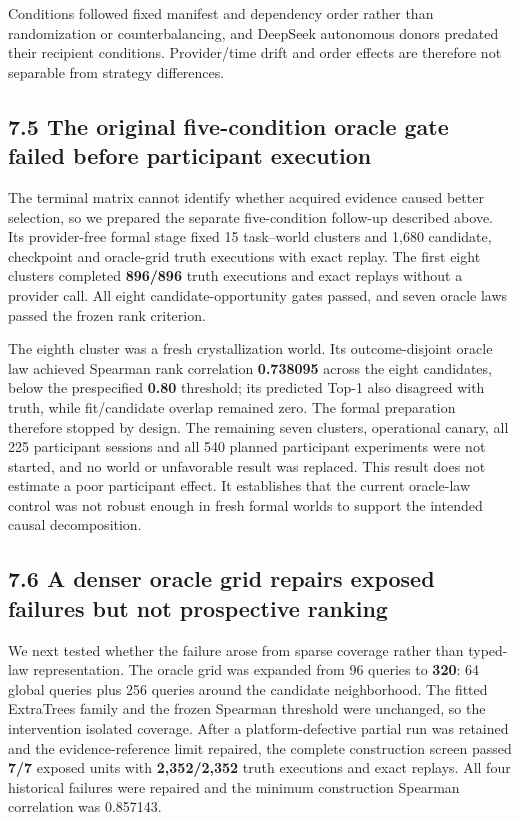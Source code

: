 \documentclass[10pt,twocolumn]{article}
\begin{document}
Conditions followed fixed manifest and dependency order rather than
randomization or counterbalancing, and DeepSeek autonomous donors
predated their recipient conditions. Provider/time drift and order
effects are therefore not separable from strategy differences.

\subsection{7.5 The original five-condition oracle gate failed before
participant
execution}\label{the-original-five-condition-oracle-gate-failed-before-participant-execution}

The terminal matrix cannot identify whether acquired evidence caused
better selection, so we prepared the separate five-condition follow-up
described above. Its provider-free formal stage fixed 15 task--world
clusters and 1,680 candidate, checkpoint and oracle-grid truth
executions with exact replay. The first eight clusters completed
\textbf{896/896} truth executions and exact replays without a provider
call. All eight candidate-opportunity gates passed, and seven oracle
laws passed the frozen rank criterion.

The eighth cluster was a fresh crystallization world. Its
outcome-disjoint oracle law achieved Spearman rank correlation
\textbf{0.738095} across the eight candidates, below the prespecified
\textbf{0.80} threshold; its predicted Top-1 also disagreed with truth,
while fit/candidate overlap remained zero. The formal preparation
therefore stopped by design. The remaining seven clusters, operational
canary, all 225 participant sessions and all 540 planned participant
experiments were not started, and no world or unfavorable result was
replaced. This result does not estimate a poor participant effect. It
establishes that the current oracle-law control was not robust enough in
fresh formal worlds to support the intended causal decomposition.

\subsection{7.6 A denser oracle grid repairs exposed failures but not
prospective
ranking}\label{a-denser-oracle-grid-repairs-exposed-failures-but-not-prospective-ranking}

We next tested whether the failure arose from sparse coverage rather
than typed-law representation. The oracle grid was expanded from 96
queries to \textbf{320}: 64 global queries plus 256 queries around the
candidate neighborhood. The fitted ExtraTrees family and the frozen
Spearman threshold were unchanged, so the intervention isolated
coverage. After a platform-defective partial run was retained and the
evidence-reference limit repaired, the complete construction screen
passed \textbf{7/7} exposed units with \textbf{2,352/2,352} truth
executions and exact replays. All four historical failures were repaired
and the minimum construction Spearman correlation was 0.857143.
\end{document}
